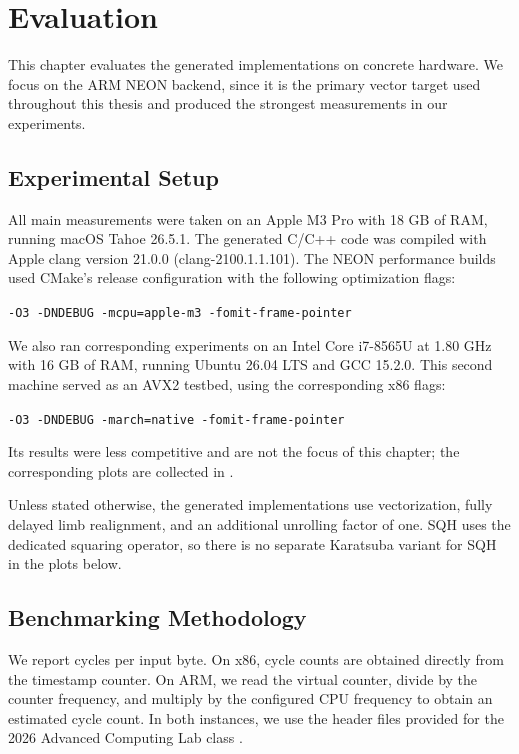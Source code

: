 \chapter{Evaluation}
\label{ch:evaluation}

This chapter evaluates the generated implementations on concrete hardware. We focus on the ARM NEON backend, since it is the primary vector target used throughout this thesis and produced the strongest measurements in our experiments.

\section{Experimental Setup}
\label{sec:evaluation-setup}

All main measurements were taken on an Apple M3 Pro with 18 GB of RAM, running macOS Tahoe 26.5.1. The generated C/C++ code was compiled with Apple clang version 21.0.0 (clang-2100.1.1.101). The NEON performance builds used CMake's release configuration with the following optimization flags:
\begin{center}
    \texttt{-O3 -DNDEBUG -mcpu=apple-m3 -fomit-frame-pointer}
\end{center}

We also ran corresponding experiments on an Intel Core i7-8565U at 1.80 GHz with 16 GB of RAM, running Ubuntu 26.04 LTS and GCC 15.2.0. This second machine served as an AVX2 testbed, using the corresponding x86 flags:
\begin{center}
    \texttt{-O3 -DNDEBUG -march=native -fomit-frame-pointer}
\end{center}
Its results were less competitive and are not the focus of this chapter; the corresponding plots are collected in .

Unless stated otherwise, the generated implementations use vectorization, fully delayed limb realignment, and an additional unrolling factor of one. SQH uses the dedicated squaring operator, so there is no separate Karatsuba variant for SQH in the plots below.

\section{Benchmarking Methodology}
\label{sec:evaluation-methodology}

We report cycles per input byte. On x86, cycle counts are obtained directly from the timestamp counter. On ARM, we read the virtual counter, divide by the counter frequency, and multiply by the configured CPU frequency to obtain an estimated cycle count. In both instances, we use the header files provided for the 2026 Advanced Computing Lab class \cite{acl2026advancedSystemsLabHw1}.

